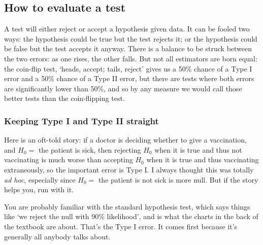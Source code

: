 \subsection{How to evaluate a test}

A test will either reject or accept a hypothesis given data. It can be
fooled two ways: the hypothesis could be true but the test rejects it;
or the hypothesis could be false but the test accepts it anyway. There
is a balance to be struck between the two errors: as one rises, the
other falls. But not all estimators are born equal: the coin-flip test, `heads, accept;
tails, reject' gives us a 50\% chance of a Type I error
and a 50\% chance of a Type II error, but there are tests where both
errors are significantly lower than 50\%, and so by any measure we would
call those better tests than the coin-flipping test. 


\subsubsection{Keeping Type I and Type II straight} 
Here is an oft-told story: if a doctor is deciding
whether to give a vaccination, and $H_0=$ the patient is sick, then
rejecting $H_0$ when it is true and thus not vaccinating is much worse
than accepting $H_0$ when it is true and thus vaccinating extraneously,
so the important error is Type I. I always thought this was totally
{\it ad hoc}, especially since $H_0=$ the patient is not sick is more
null. But if the story helps you, run with it.

You are probably familiar with the
standard hypothesis test, which says things like `we reject the null with 90\%
likelihood', and is what the charts in the back of the textbook are about.
That's the Type I error. It comes first because
it's generally all anybody talks about.


